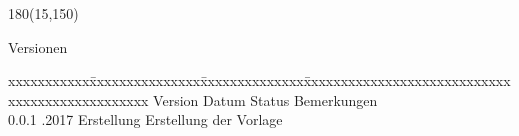 
\begin{textblock}{180}(15,150)
\color{black}
\begin{huge}
Versionen
\end{huge}
\vspace{10mm}

\fontsize{10pt}{18pt}\selectfont
\begin{tabbing}
xxxxxxxxxxx\=xxxxxxxxxxxxxxx\=xxxxxxxxxxxxxx\=xxxxxxxxxxxxxxxxxxxxxxxxxxxxxxxxxxxxxxxxxxxxxxx \kill
Version	\> Datum	\> Status		\> Bemerkungen		\\
0.0.1	.2017	\> Erstellung		\> Erstellung der Vorlage	\\
\end{tabbing}

\end{textblock}

